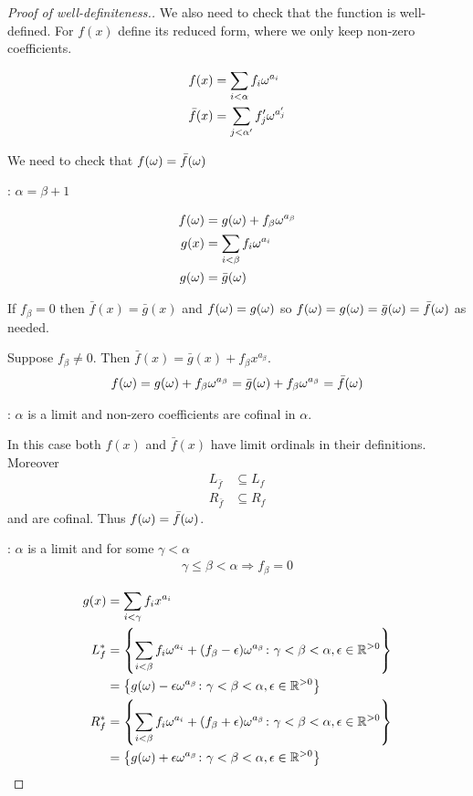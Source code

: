 \begin{proof}[Proof of well-definiteness.] %
	We also need to check that the function is well-defined. For $f(x)$ define its reduced form, where we only keep non-zero coefficients.

	\begin{align*}
		f(x) &= \sum_{i < \alpha} f_i \omega^{a_i} \\
		\bar f(x) &= \sum_{j < \alpha'} f_j' \omega^{a_j'}
	\end{align*}

	We need to check that $f(\omega) = \bar f(\omega)$

	: $\alpha = \beta + 1$

	\begin{align*}
		f(\omega) &= g(\omega) + f_\beta \omega^{a_\beta} \\
		g(x) &= \sum_{i < \beta} f_i \omega^{a_i} \\
		g(\omega) &= \bar g(\omega)
	\end{align*}

	If $f_\beta = 0$ then $\bar f(x) = \bar g(x)$ and $f(\omega) = g(\omega)$ so $f(\omega) = g(\omega) = \bar g(\omega) = \bar f(\omega)$ as needed.

	Suppose $f_\beta \neq 0$. Then $\bar f(x) = \bar g(x) + f_\beta x^{a_\beta}$.
	\begin{align*}
		f(\omega) = g(\omega) + f_\beta \omega^{a_\beta} = \bar g(\omega) + f_\beta \omega^{a_\beta} = \bar f(\omega)
	\end{align*}

	: $\alpha$ is a limit and non-zero coefficients are cofinal in $\alpha$.

	In this case both $f(x)$ and $\bar f(x)$ have limit ordinals in their definitions. Moreover 
	\begin{align*}
		L_{\bar f} &\subseteq L_f \\
		R_{\bar f} &\subseteq R_f
	\end{align*}
	and are cofinal. Thus $f(\omega) = \bar f(\omega)$.

	: $\alpha$ is a limit and for some $\gamma < \alpha$
	\begin{align*}
		\gamma \leq \beta < \alpha \Rightarrow f_\beta = 0
	\end{align*}

	\begin{align*}
		g(x) &= \sum_{i < \gamma} f_i x^{a_i} \\
		L_f^* &= \left\{ \sum_{i < \beta} f_i \omega^{a_i} + (f_\beta - \epsilon) \omega^{a_\beta}
		\colon \gamma < \beta < \alpha, \epsilon \in \mathbb{R}^{>0} \right\} \\
		&= \left\{ g(\omega) - \epsilon \omega^{a_\beta}
		\colon \gamma < \beta < \alpha, \epsilon \in \mathbb{R}^{>0} \right\} \\
		R_f^* &= \left\{ \sum_{i < \beta} f_i \omega^{a_i} + (f_\beta + \epsilon) \omega^{a_\beta}
		\colon \gamma < \beta < \alpha, \epsilon \in \mathbb{R}^{>0} \right\} \\
		&= \left\{ g(\omega) + \epsilon \omega^{a_\beta}
		\colon \gamma < \beta < \alpha, \epsilon \in \mathbb{R}^{>0} \right\}
	\end{align*}


\end{proof}
